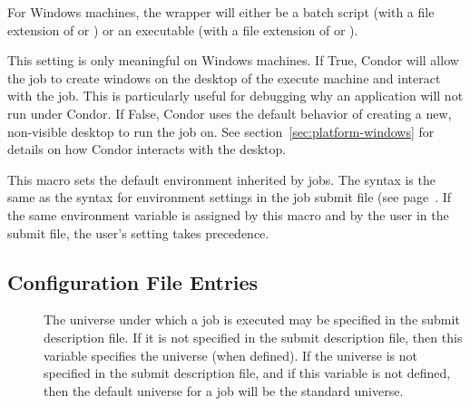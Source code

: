 \begin{description}
  For Windows machines, the wrapper will either be
  a batch script (with a file extension of  or )
  or an executable (with a file extension of  or ).

\item[\Macro{USE\_VISIBLE\_DESKTOP}] \label{param:UseVisibleDesktop} 
  This setting is only meaningful on Windows machines.  If True, Condor will
  allow the job to create windows on the desktop of the execute machine and
  interact with the job.  This is particularly useful for debugging why an
  application will not run under Condor.  If False, Condor uses the default
  behavior of creating a new, non-visible desktop to run the job on.
  See section~\ref{sec:platform-windows} for details on how Condor 
  interacts with the desktop.

\item[\Macro{STARTER\_JOB\_ENVIRONMENT}] \label{param:StarterJobEnvironment}
  This macro sets the default environment inherited by jobs.  The syntax is
  the same as the syntax for environment settings in the job submit file
  (see page~\pageref{man-condor-submit-environment}.
  If the same environment variable is assigned by this macro and by the user
  in the submit file, the user's setting takes precedence.

\end{description}

\subsection{\label{sec:Submit-Config-File-Entries}
Configuration File Entries}
\begin{description}
\item[] \label{param:DefaultUniverse}
The universe under which a job is executed may be specified in the submit
description file.
If it is not specified in the submit description file, then
this variable specifies the universe (when defined).
If the universe is not specified in the submit description
file, and if this variable is not defined, then
the default universe for a job will be the standard universe.
\end{description}

